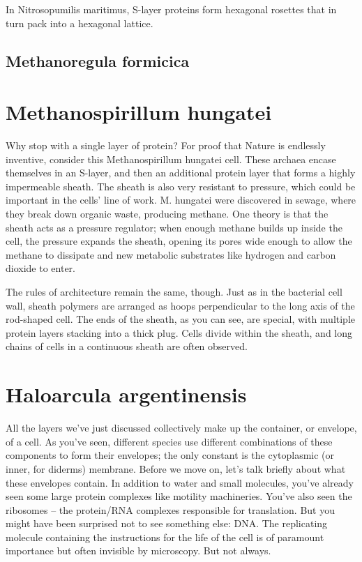 \documentclass[]{tufte-book}
\begin{document}
In Nitrosopumilis maritimus, S-layer proteins form hexagonal rosettes that in turn pack into a hexagonal lattice.

\hypertarget{htmlwidget-4b69204d5eccfa32c4ed}{}

\hypertarget{Methanoregula_formicica}{%
\subsection{Methanoregula formicica}\label{Methanoregula_formicica}}

\hypertarget{htmlwidget-2698b0b23fa6eeb86058}{}

\hypertarget{methanospirillum-hungatei}{%
\section{Methanospirillum hungatei}\label{methanospirillum-hungatei}}

Why stop with a single layer of protein? For proof that Nature is endlessly inventive, consider this Methanospirillum hungatei cell. These archaea encase themselves in an S-layer, and then an additional protein layer that forms a highly impermeable sheath. The sheath is also very resistant to pressure, which could be important in the cells' line of work. M. hungatei were discovered in sewage, where they break down organic waste, producing methane. One theory is that the sheath acts as a pressure regulator; when enough methane builds up inside the cell, the pressure expands the sheath, opening its pores wide enough to allow the methane to dissipate and new metabolic substrates like hydrogen and carbon dioxide to enter.

The rules of architecture remain the same, though. Just as in the bacterial cell wall, sheath polymers are arranged as hoops perpendicular to the long axis of the rod-shaped cell. The ends of the sheath, as you can see, are special, with multiple protein layers stacking into a thick plug. Cells divide within the sheath, and long chains of cells in a continuous sheath are often observed.

\hypertarget{htmlwidget-817534ff9a11b88ede63}{}

\hypertarget{haloarcula-argentinensis}{%
\section{Haloarcula argentinensis}\label{haloarcula-argentinensis}}

All the layers we've just discussed collectively make up the container, or envelope, of a cell. As you've seen, different species use different combinations of these components to form their envelopes; the only constant is the cytoplasmic (or inner, for diderms) membrane. Before we move on, let's talk briefly about what these envelopes contain. In addition to water and small molecules, you've already seen some large protein complexes like motility machineries. You've also seen the ribosomes -- the protein/RNA complexes responsible for translation. But you might have been surprised not to see something else: DNA. The replicating molecule containing the instructions for the life of the cell is of paramount importance but often invisible by microscopy. But not always.
\end{document}
